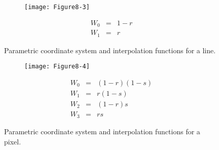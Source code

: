 \begin{description}[leftmargin=0cm,labelindent=0cm]

    \begin{figure}[!htb]
        \centering
        \begin{subfigure}{0.48\linewidth}
            \centering
            \texttt{[image: Figure8-3]}
            \caption*{}
        \end{subfigure}
        \hfill
        \begin{subfigure}{0.48\linewidth}
            \centering
            \begin{equation*}
            \begin{array}{lll}
                W_0 &=& 1-r \\
                W_1 &=& r
            \end{array}
            \end{equation*}
        \end{subfigure}%
        \caption{Parametric coordinate system and interpolation functions for a line.}
        \label{fig:Figure8-3}
    \end{figure}

    \begin{figure}[!htb]
        \centering
        \begin{subfigure}{0.48\linewidth}
            \centering
            \texttt{[image: Figure8-4]}
            \caption*{}
        \end{subfigure}
        \hfill
        \begin{subfigure}{0.48\linewidth}
            \centering
            \begin{equation*}
            \begin{array}{lll}
            W_0 &=& (1-r)(1 - s) \\
            W_1 &=& r(1 - s) \\
            W_2 &=& (1 - r)s \\
            W_3 &=& r s
            \end{array}
            \end{equation*}
        \end{subfigure}%
        \caption{Parametric coordinate system and interpolation functions for a pixel.}
        \label{fig:Figure8-4}
    \end{figure}


\end{description}
